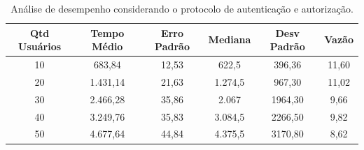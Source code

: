 \begin{table}[h]
\begin{center}
\begin{tabular}{|c|c|c|c|c|c|}
\hline
Qtd Usuários    & Tempo Médio   & Erro Padrão & Mediana  & Desv Padrão  & Vazão    \\ \hline
10              & 683,84        & 12,53       & 622,5    & 396,36       & 11,60    \\ \hline
20              & 1.431,14      & 21,63       & 1.274,5  & 967,30       & 11,02    \\ \hline
30              & 2.466,28      & 35,86       & 2.067    & 1964,30      & 9,66     \\ \hline
40              & 3.249,76      & 35,83       & 3.084,5  & 2266,50      & 9,82     \\ \hline
50              & 4.677,64      & 44,84       & 4.375,5  & 3170,80      & 8,62     \\ \hline
\end{tabular}\caption {Análise de desempenho considerando o protocolo de autenticação e autorização.}\label{tb:estatistica_com_cripto}
\end{center}
\end{table}

